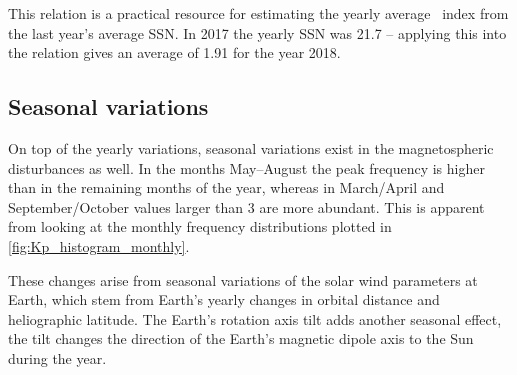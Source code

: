 This relation is a practical resource for estimating the yearly average \Kp~index from the last year's average SSN. In 2017 the yearly SSN was \num{21.7} -- applying this into the relation gives an average \Kp{} of \num{1.91} for the year 2018.

\subsection{Seasonal variations}
On top of the yearly variations, seasonal variations exist in the magnetospheric disturbances as well. In the months May--August the \Kp{} peak frequency is higher than in the remaining months of the year, whereas in March/April and September/October \Kp{} values larger than 3 are more abundant. This is apparent from looking at the monthly \Kp{} frequency distributions plotted in \autoref{fig:Kp_histogram_monthly}.
\begin{figure}[htb]
	\begin{floatrow}
	\end{floatrow}
\end{figure}
These \Kp{} changes arise from seasonal variations of the solar wind parameters at Earth, which stem from Earth's yearly changes in orbital distance and heliographic latitude. The Earth's rotation axis tilt adds another seasonal effect, the tilt changes the direction of the Earth's magnetic dipole axis to the Sun during the year.


